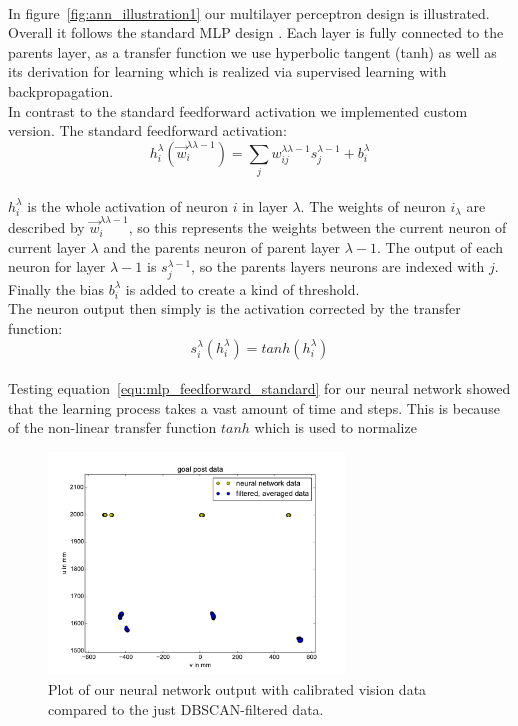 \documentclass[lnicst,a4paper]{svmultln}
\begin{document}
\\
In figure~\ref{fig:ann_illustration1} our multilayer perceptron design is illustrated. Overall it follows the standard MLP design \cite{mlp}. Each layer is fully connected to the parents layer, as a transfer function we use hyperbolic tangent (tanh) as well as its derivation for learning which is realized via supervised learning with backpropagation.
\\
In contrast to the standard feedforward activation we implemented custom version. The standard feedforward activation:
\\
\begin{equation}
\label{equ:mlp_feedforward_standard}
h_{i}^{\lambda} (\vec{w}_{i}^{\lambda \lambda-1})
=
\sum\limits_{j} w_{ij}^{\lambda \lambda-1} s_{j}^{\lambda-1} + b_{i}^{\lambda}
\end{equation}
\\
$h_{i}^{\lambda}$ is the whole activation of neuron $i$ in layer $\lambda$. The weights of neuron $i_{\lambda}$ are described by $\vec{w}_{i}^{\lambda \lambda-1}$, so this represents the weights between the current neuron of current layer $\lambda$ and the parents neuron of parent layer $\lambda-1$. The output of each neuron for layer $\lambda-1$ is $s_{j}^{\lambda-1}$, so the parents layers neurons are indexed with $j$. Finally the bias $b_{i}^{\lambda}$ is added to create a kind of threshold.
\\
The neuron output then simply is the activation corrected by the transfer function:
\\
\begin{equation}
\label{equ:mlp_neuron_output}
s_{i}^{\lambda} (h_{i}^{\lambda}) = tanh(h_{i}^{\lambda})
\end{equation}
\\
Testing equation~\ref{equ:mlp_feedforward_standard} for our neural network showed that the learning process takes a vast amount of time and steps. This is because of the non-linear transfer function $tanh$ which is used to normalize 
\\
\begin{figure}
 	\centerline{\includegraphics[width=0.7\textwidth]{ann_plot1.pdf}}
	{\caption{Plot of our neural network output with calibrated vision data compared to the just DBSCAN-filtered data.}\label{fig:ann_plot1}}
\end{figure}
\end{document}
